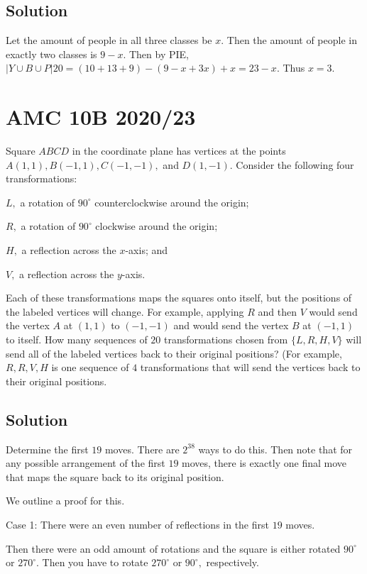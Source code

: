 \documentclass[blue,onecol]{shooting}
\begin{document}
\subsection{Solution}
Let the amount of people in all three classes be $x.$ Then the amount of people in exactly two classes is $9-x.$ Then by PIE, $|Y\cup B\cup P|20=(10+13+9)-(9-x+3x)+x=23-x.$ Thus $x=3.$

\section{AMC 10B 2020/23}
Square $ABCD$ in the coordinate plane has vertices at the points $A(1,1), B(-1,1), C(-1,-1),$ and $D(1,-1).$ Consider the following four transformations:
    
\begin{itemize}
    \Item $L,$ a rotation of $90^{\circ}$ counterclockwise around the origin;

    \Item $R,$ a rotation of $90^{\circ}$ clockwise around the origin;
    
    \Item $H,$ a reflection across the $x$-axis; and

    \Item $V,$ a reflection across the $y$-axis.
\end{itemize}

Each of these transformations maps the squares onto itself, but the positions of the labeled vertices will change. For example, applying $R$ and then $V$ would send the vertex $A$ at $(1,1)$ to $(-1,-1)$ and would send the vertex $B$ at $(-1,1)$ to itself. How many sequences of $20$ transformations chosen from $\{L, R, H, V\}$ will send all of the labeled vertices back to their original positions? (For example, $R, R, V, H$ is one sequence of $4$ transformations that will send the vertices back to their original positions.

\subsection{Solution}
Determine the first $19$ moves. There are $2^{38}$ ways to do this. Then note that for any possible arrangement of the first $19$ moves, there is exactly one final move that maps the square back to its original position.
    
We outline a proof for this.
    
Case 1: There were an even number of reflections in the first $19$ moves.

Then there were an odd amount of rotations and the square is either rotated $90^{\circ}$ or $270^{\circ}.$ Then you have to rotate $270^{\circ}$ or $90^{\circ},$ respectively.
\end{document}
